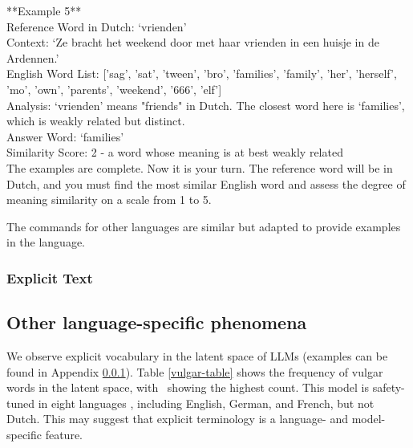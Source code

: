 \begin{displayquote}
**Example 5** \\ 
Reference Word in Dutch: ‘vrienden’ \\ 
Context: ‘Ze bracht het weekend door met haar vrienden in een huisje in de Ardennen.’ \\
English Word List: ['sag', 'sat', 'tween', 'bro', 'families', 'family', 'her', 'herself', 'mo', 'own', 'parents', 'weekend', '666', 'elf'] \\ 

Analysis: ‘vrienden’ means "friends" in Dutch. The closest word here is ‘families’, which is weakly related but distinct. \\ 
Answer Word: ‘families’ \\ 
Similarity Score: 2 - a word whose meaning is at best weakly related \\ 


The examples are complete. Now it is your turn. The reference word will be in Dutch, and you must find the most similar English word and assess the degree of meaning similarity on a scale from 1 to 5.
\end{displayquote}

The commands for other languages are similar but adapted to provide examples in the language. 

\newpage 
\subsubsection{Explicit Text} \label{sec:explicit_text}

\subsection{Other language-specific phenomena} 
We observe explicit vocabulary in the latent space of LLMs (examples can be found in Appendix \ref{sec:explicit_text}). 
Table \ref{vulgar-table} shows the frequency of vulgar words in the latent space, with \llama \ showing the highest count. This model is safety-tuned in eight languages \citep{dubey2024llama3herdmodels}, including English, German, and French, but not Dutch.
This may suggest that explicit terminology is a language- and model-specific feature.

